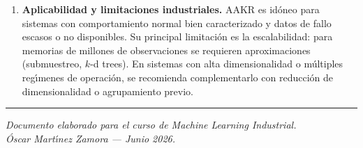 \documentclass[12pt,a4paper]{article}
\begin{document}
\begin{enumerate}[leftmargin=2em, label=\textbf{\arabic*.}]
  \item \textbf{Aplicabilidad y limitaciones industriales.} AAKR es id\'oneo para
        sistemas con comportamiento normal bien caracterizado y datos de fallo
        escasos o no disponibles. Su principal limitaci\'on es la escalabilidad:
        para memorias de millones de observaciones se requieren aproximaciones
        (submuestreo, $k$-d trees). En sistemas con alta dimensionalidad o
        m\'ultiples reg\'{\i}menes de operaci\'on, se recomienda complementarlo con
        reducci\'on de dimensionalidad o agrupamiento previo.

\end{enumerate}

\vspace{1cm}
\noindent\rule{\linewidth}{0.8pt}
\begin{center}
  \small\itshape
  Documento elaborado para el curso de Machine Learning Industrial.\\
  \'Oscar Mart\'{\i}nez Zamora --- Junio 2026.
\end{center}
\end{document}
